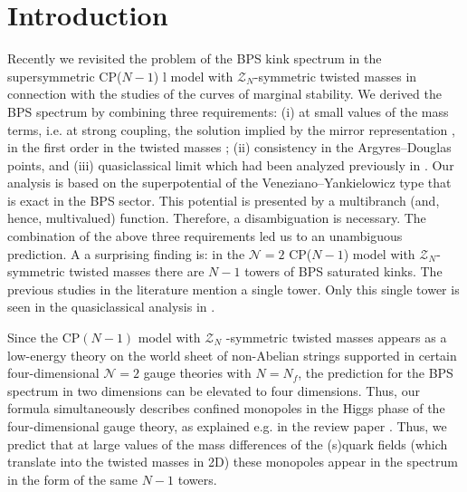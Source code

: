 \documentclass[epsfig,12pt]{article}
\newcommand{\mc}[1]{\mathcal{#1}}
\begin{document}
\section{Introduction}
\setcounter{equation}{0}


Recently we revisited the problem of  the BPS kink spectrum in 
	the supersymmetric CP($N-1$) l model with $\mc{Z}_N$-symmetric twisted masses 
	\cite{Bolokhov:2011mp} in connection with the studies of the curves of marginal stability.
	We derived the BPS spectrum by combining three requirements: (i) at small values of the mass terms, i.e. at strong 
	coupling, the solution implied by the mirror representation \cite{MR1,MR2}, in the first order in the twisted 
	masses \cite{Shifman:2010id}; (ii) consistency in the Argyres--Douglas points, and (iii) quasiclassical limit which had been analyzed previously in \cite{Dor}. 
	Our analysis is based on the  superpotential of the Veneziano--Yankielowicz type that is
	exact in the BPS sector. This potential is presented by a multibranch (and, hence, multivalued)
	function. Therefore, a disambiguation is necessary. The combination of the above three requirements led us
	to an unambiguous prediction. A 
	a surprising finding is: in the ${\mathcal N} =2$ CP($N-1$) model with  $\mc{Z}_N$-symmetric twisted masses
	there are $N-1$ towers of BPS saturated kinks. The previous studies in the literature mention a single tower. 
	Only this single  tower is seen in the quasiclassical analysis in \cite{Dor}.
	
	Since the CP$(N -1)$ model with $\mc{Z}_N$ -symmetric twisted masses appears as a low-energy theory on
	the world sheet of non-Abelian strings \cite{Shifman:2004dr} supported in certain four-dimensional ${\mathcal N} =2$
	gauge theories with $N=N_f$, the prediction for the BPS spectrum in two dimensions can be elevated to four dimensions.
	Thus, our formula simultaneously describes confined monopoles in the Higgs phase of the four-dimensional gauge theory,
	as explained e.g. in the review paper   \cite{Shifman:2007ce}.
	Thus, we predict that at large values of the mass differences of the (s)quark fields
	(which translate into the twisted masses in 2D)  these monopoles appear in the spectrum in the form of 
	the same $N-1$ towers.
	
\end{document}
